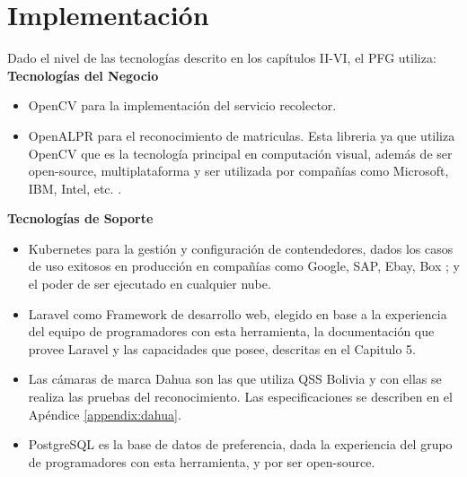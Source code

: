 \chapter{Implementación}
Dado el nivel de las tecnologías descrito en los capítulos II-VI, el PFG utiliza:
\textbf{Tecnologías del Negocio}
\begin{itemize}
    \item OpenCV para la implementación del servicio recolector.
    \item OpenALPR para el reconocimiento de matriculas. Esta libreria ya que utiliza OpenCV que es la tecnología principal en computación visual, además de ser open-source, multiplataforma y ser utilizada por compañías como Microsoft, IBM, Intel, etc. \cite{Itseez2000-he}.
\end{itemize}

\textbf{Tecnologías de Soporte}
\begin{itemize}
    \item Kubernetes para la gestión y configuración de contendedores, dados los casos de uso exitosos en producción en compañías como Google, SAP, Ebay, Box \cite{Kubernetes2016-ub}; y el poder de ser ejecutado en cualquier nube.
    
    \item Laravel como Framework de desarrollo web, elegido en base a la experiencia del equipo de programadores con esta herramienta, la documentación que provee Laravel y las capacidades que posee, descritas en el Capitulo 5.
        
    \item Las cámaras de marca Dahua son las que utiliza QSS Bolivia y con ellas se realiza las pruebas del reconocimiento. Las especificaciones se describen en el Apéndice \ref{appendix:dahua}.

    \item PostgreSQL es la base de datos de preferencia, dada la experiencia del grupo de programadores con esta herramienta, y por ser open-source.
\end{itemize}
    